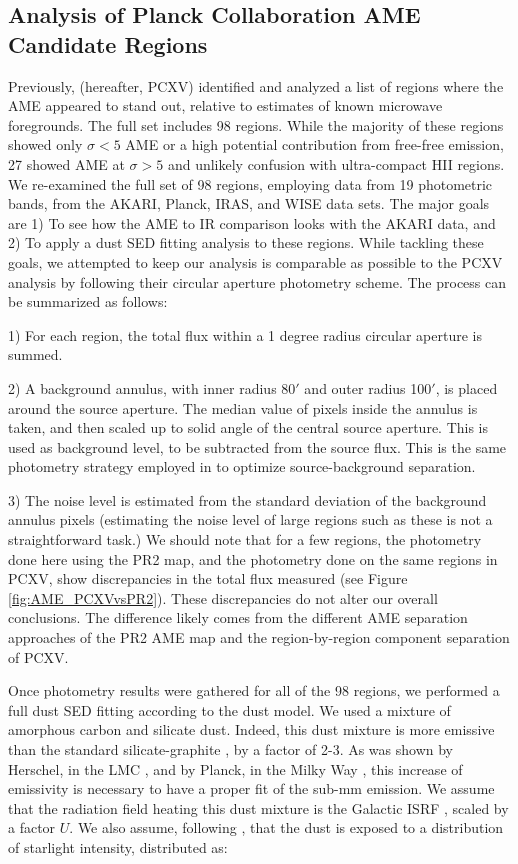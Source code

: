\documentclass[preprint2,longabstract]{aastex}
\begin{document}
\subsection{Analysis of Planck Collaboration AME Candidate Regions}

     Previously, \cite{planckXV} (hereafter, PCXV) identified and analyzed a list of regions where the AME appeared to stand out, relative to estimates of known microwave foregrounds. The full set includes 98 regions. While the majority of these regions showed only $\sigma{} < 5$ AME or a high potential contribution from free-free emission, 27 showed AME at $\sigma{} > 5$ and unlikely confusion with ultra-compact HII regions. We re-examined the full set of 98 regions, employing data from 19 photometric bands, from the AKARI, Planck, IRAS, and WISE data sets. The major goals are 1) To see how the AME to IR comparison looks with the AKARI data, and 2) To apply a dust SED fitting analysis to these regions. While tackling these goals, we attempted to keep our analysis is comparable as possible to the PCXV analysis by following their circular aperture photometry scheme. The process can be summarized as follows:

     1) For each region, the total flux within a 1 degree radius circular aperture is summed.

     2) A background annulus, with inner radius 80$'$ and outer radius 100$'$, is placed around the source aperture. The median value of pixels inside the annulus is taken, and then scaled up to solid angle of the central source aperture. This is used as background level, to be subtracted from the source flux. This is the same photometry strategy employed in \cite{planckXV} to optimize source-background separation.

     3) The noise level is estimated from the standard deviation of the background annulus pixels (estimating the noise level of large regions such as these is not a straightforward task.) We should note that for a few regions, the photometry done here using the PR2 map, and the photometry done on the same regions in PCXV, show discrepancies in the total flux measured (see Figure \ref{fig:AME_PCXVvsPR2}). These discrepancies do not alter our overall conclusions. The difference likely comes from the different AME separation approaches of the PR2 AME map and the region-by-region component separation of PCXV.

     Once photometry results were gathered for all of the 98 regions, we performed a full dust SED fitting according to the \cite{galliano11} dust model. We used a mixture of amorphous carbon and silicate dust. Indeed, this dust mixture is more emissive than the standard silicate-graphite \citep{draine07}, by a factor of 2-3. As was shown by Herschel, in the LMC \citep{galliano11}, and by Planck, in the Milky Way \citep{planck16}, this increase of emissivity is necessary to have a proper fit of the sub-mm emission. We assume that the radiation field heating this dust mixture is the Galactic ISRF \citep{math83}, scaled by a factor $U$. We also assume, following \cite{dale01}, that the dust is exposed to a distribution of starlight intensity, distributed as:
\end{document}
